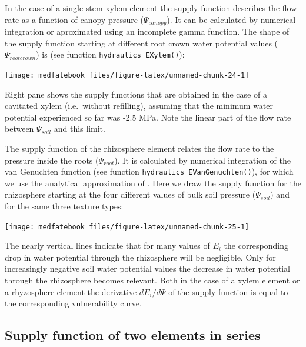 \documentclass[]{book}
\begin{document}
In the case of a single stem xylem element the supply function describes
the flow rate as a function of canopy pressure (\(\Psi_{canopy}\)). It
can be calculated by numerical integration or aproximated using an
incomplete gamma function. The shape of the supply function starting at
different root crown water potential values (\(\Psi_{rootcrown}\)) is
(see function \texttt{hydraulics\_EXylem()}):

\begin{center}\texttt{[image: medfatebook\_files/figure-latex/unnamed-chunk-24-1]} \end{center}

Right pane shows the supply functions that are obtained in the case of a
cavitated xylem (i.e.~without refilling), assuming that the minimum
water potential experienced so far was -2.5 MPa. Note the linear part of
the flow rate between \(\Psi_{soil}\) and this limit.

The supply function of the rhizosphere element relates the flow rate to
the pressure inside the roots (\(\Psi_{root}\)). It is calculated by
numerical integration of the van Genuchten function (see function
\texttt{hydraulics\_EVanGenuchten()}), for which we use the analytical
approximation of \citet{VanLier2009}. Here we draw the supply function
for the rhizosphere starting at the four different values of bulk soil
pressure (\(\Psi_{soil}\)) and for the same three texture types:

\begin{center}\texttt{[image: medfatebook\_files/figure-latex/unnamed-chunk-25-1]} \end{center}

The nearly vertical lines indicate that for many values of \(E_i\) the
corresponding drop in water potential through the rhizosphere will be
negligible. Only for increasingly negative soil water potential values
the decrease in water potential through the rhizosphere becomes
relevant. Both in the case of a xylem element or a rhyzosphere element
the derivative \(dE_i/d\Psi\) of the supply function is equal to the
corresponding vulnerability curve.

\subsection{Supply function of two elements in
series}\label{supply-function-of-two-elements-in-series}
\end{document}
